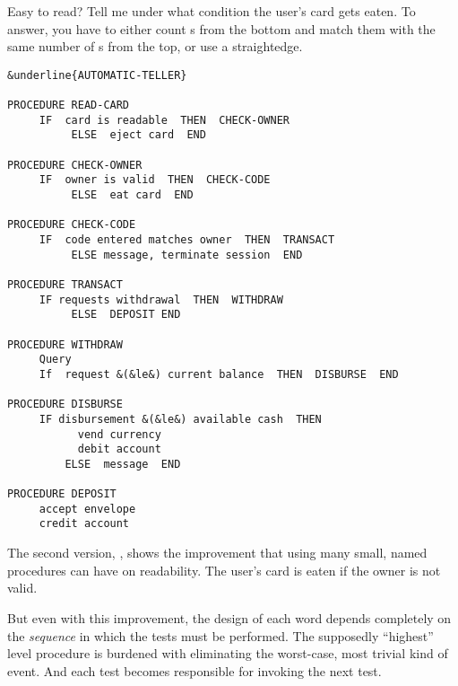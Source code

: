 Easy to read? Tell me under what condition the user's card gets eaten. To
answer, you have to either count s from the bottom and match
them with the same number of s from the top, or use a
straightedge.

\begin{figure*}[tttt]
\small\begin{center}
\begin{BVerbatim}[commandchars=\&\{\},baselinestretch=0.85]
&underline{AUTOMATIC-TELLER}

PROCEDURE READ-CARD
     IF  card is readable  THEN  CHECK-OWNER
          ELSE  eject card  END

PROCEDURE CHECK-OWNER
     IF  owner is valid  THEN  CHECK-CODE
          ELSE  eat card  END

PROCEDURE CHECK-CODE
     IF  code entered matches owner  THEN  TRANSACT
          ELSE message, terminate session  END

PROCEDURE TRANSACT
     IF requests withdrawal  THEN  WITHDRAW
          ELSE  DEPOSIT END

PROCEDURE WITHDRAW
     Query
     If  request &(&le&) current balance  THEN  DISBURSE  END

PROCEDURE DISBURSE
     IF disbursement &(&le&) available cash  THEN
           vend currency
           debit account
         ELSE  message  END

PROCEDURE DEPOSIT
     accept envelope
     credit account
\end{BVerbatim}
\end{center}
\end{figure*}
The second version, , shows the improvement that using many
small, named procedures can have on readability. The user's card is eaten
if the owner is not valid.

But even with this improvement, the design of each word depends completely
on the \emph{sequence} in which the tests must be performed. The
supposedly ``highest'' level procedure is burdened with eliminating the
worst-case, most trivial kind of event. And each test becomes responsible
for invoking the next test.

